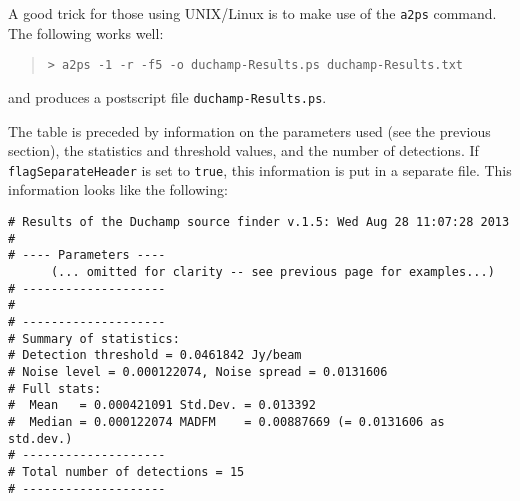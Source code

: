 A good trick for those using UNIX/Linux is to make use of the
\texttt{a2ps} command. The following works well:
\begin{quote}
{\footnotesize
\texttt{> a2ps -1 -r -f5 -o duchamp-Results.ps duchamp-Results.txt}
}
\end{quote}
and produces a postscript file \texttt{duchamp-Results.ps}.

The table is preceded by information on the parameters used (see the
previous section), the statistics and threshold values, and the number
of detections. If \texttt{flagSeparateHeader} is set to \texttt{true},
this information is put in a separate file. This information looks
like the following:

{\footnotesize
\begin{verbatim}
# Results of the Duchamp source finder v.1.5: Wed Aug 28 11:07:28 2013
#
# ---- Parameters ----
      (... omitted for clarity -- see previous page for examples...)
# --------------------
#
# --------------------
# Summary of statistics:
# Detection threshold = 0.0461842 Jy/beam
# Noise level = 0.000122074, Noise spread = 0.0131606
# Full stats:
#  Mean   = 0.000421091	Std.Dev. = 0.013392
#  Median = 0.000122074	MADFM    = 0.00887669 (= 0.0131606 as std.dev.)
# --------------------
# Total number of detections = 15
# --------------------
\end{verbatim}
}

